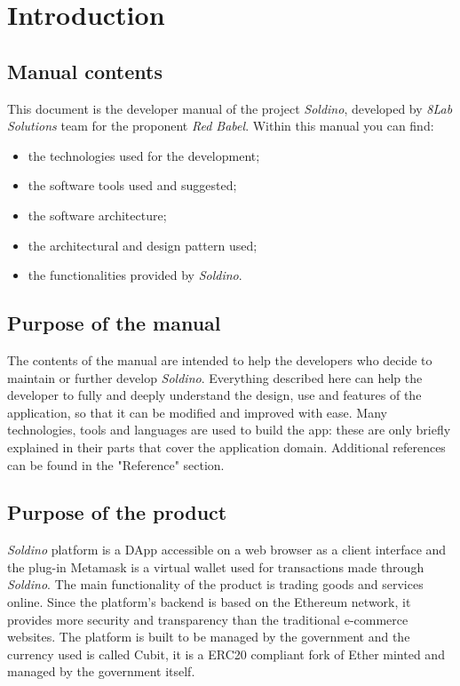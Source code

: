 \section{Introduction} 
\subsection{Manual contents}
This document is the developer manual of the project \textit{Soldino}, developed by \textit{8Lab Solutions} team for the proponent \textit{Red Babel}.\newline
Within this manual you can find:
\begin{itemize}
	\item the technologies used for the development;
	\item the software tools used and suggested;
	\item the software architecture;
	\item the architectural and design pattern used;
	\item the functionalities provided by \textit{Soldino}.
\end{itemize}

\subsection{Purpose of the manual}
The contents of the manual are intended to help the developers who decide to 
maintain or further develop \textit{Soldino}. Everything described here can 
help the developer to fully and deeply understand the design, use and features 
of the application, so that it can be modified and improved with ease.\newline
Many technologies, tools and languages are used to build the app: these are 
only briefly explained in their parts that cover the application domain. 
Additional references can be found in the "Reference" section.

\subsection{Purpose of the product}
\textit{Soldino} platform is a DApp accessible on a web browser as a 
client interface and the plug-in Metamask is a virtual wallet used for transactions made through \textit{Soldino}.\newline
The main functionality of the product is trading goods and services 
online. Since the platform's backend is based on the Ethereum network, it 
provides more security and transparency than the traditional e-commerce 
websites.\newline
The platform is built to be managed by the government and the currency used is 
called Cubit, it is a ERC20 compliant fork of Ether minted and managed by 
the government itself.

